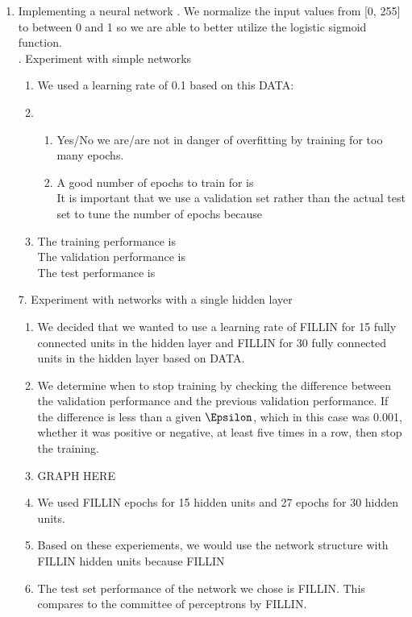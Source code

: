 \documentclass[11pt]{article}
\begin{document}
\begin{enumerate}
\begin{enumerate}
	\end{enumerate}
\item Implementing a neural network
\newline
{}. We normalize the input values from [0, 255] to between 0 and 1 so we are able to better utilize the logistic sigmoid function.\\ 
. Experiment with simple networks
\begin{enumerate}
\item We used a learning rate of 0.1 based on this DATA:
\item 
\begin{enumerate}
\item Yes/No we are/are not in danger of overfitting by training for too many epochs.
\item A good number of epochs to train for is
\\It is important that we use a validation set rather than the actual test set to tune the number of epochs because
\end{enumerate}
\item The training performance is
\\ The validation performance is
\\ The test performance is
\end{enumerate} 
7. Experiment with networks with a single hidden layer
\begin{enumerate}
\item We decided that we wanted to use a learning rate of FILLIN for 15 fully connected units in the hidden layer and FILLIN for 30 fully connected units in the hidden layer based on DATA.
\item We determine when to stop training by checking the difference between the validation performance and the previous validation performance. If the difference is less than a given $\Epsilon$, which in this case was 0.001, whether it was positive or negative, at least five times in a row, then stop the training.
\item GRAPH HERE
\item We used FILLIN epochs for 15 hidden units and 27 epochs for 30 hidden units.
\item Based on these experiements, we would use the network structure with FILLIN hidden units because FILLIN
\item The test set performance of the network we chose is FILLIN. This compares to the committee of perceptrons by FILLIN.

\end{enumerate}
\end{enumerate}
\end{document}
